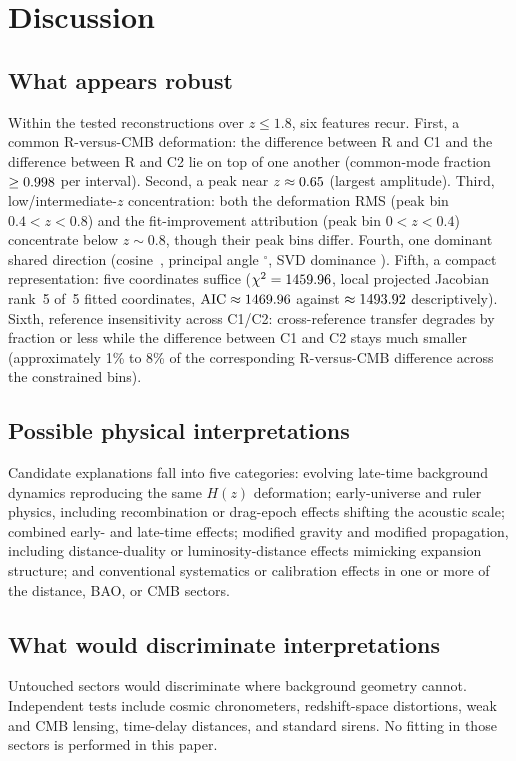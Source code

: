 \section{Discussion}
\label{sec:discussion}

\subsection{What appears robust}
\label{sec:robust}

Within the tested reconstructions over $z\le1.8$, six features recur. First, a
common R-versus-CMB deformation: the difference between R and C1 and the difference between R and C2 lie on
top of one another (common-mode fraction
$\ge0.998{}$ per interval). Second, a peak near
$z\approx0.65{}$ (largest amplitude). Third, low/intermediate-$z$
concentration: both the deformation RMS (peak bin $0.4<z<0.8$)
and the
fit-improvement attribution (peak bin $0<z<0.4$) concentrate below
$z\sim0.8$, though their peak bins differ. Fourth, one
dominant shared direction (cosine~\GeometryCosineSimilarity{},
principal angle \GeometryPrincipalAngle$^{\circ}$, SVD dominance
\GeometrySvdDominance{}). Fifth, a compact representation: five
coordinates suffice
($\chi^{2}=1459.96{}$, local projected Jacobian rank~5 of~5
fitted coordinates,
$\mathrm{AIC}\approx1469.96{}$ against
$\approx1493.92{}$ descriptively). Sixth, reference
insensitivity across C1/C2:
cross-reference transfer degrades by fraction
\GeometryTransferDegradation{} or less while the difference between C1 and C2
stays much smaller (approximately 1\% to 8\% of the corresponding R-versus-CMB difference across the
constrained bins).

\subsection{Possible physical interpretations}
\label{sec:interpretations}

Candidate explanations fall into five categories: evolving
late-time background dynamics reproducing the same $H(z)$
deformation; early-universe and ruler physics, including
recombination or drag-epoch effects shifting the acoustic scale;
combined early- and late-time effects; modified
gravity and modified propagation, including distance-duality or
luminosity-distance effects mimicking expansion structure; and
conventional systematics or calibration effects in one or more of
the distance, BAO, or CMB sectors.

\subsection{What would discriminate interpretations}
\label{sec:discriminate}

Untouched sectors would discriminate where background geometry
cannot. Independent tests include cosmic chronometers, redshift-space
distortions, weak and CMB lensing, time-delay distances, and standard
sirens. No fitting in those sectors is
performed in this paper.
